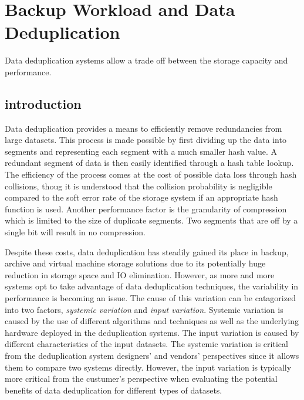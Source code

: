 \chapter{Backup Workload and Data Deduplication}
\label{dedup}
Data deduplication systems allow a trade off between the storage capacity and performance\cite{}. 
\section{introduction}
Data deduplication provides a means to efficiently remove redundancies from large datasets. This process is made possible by first dividing up the data into segments and representing each segment with a much smaller hash value. A redundant segment of data is then easily identified through a hash table lookup. The efficiency of the process comes at the cost of possible data loss through hash collisions, thoug it is understood that the collision probability is negligible compared to the soft error rate of the storage system if an appropriate hash function is used\cite{Aronovich:2009:DSB:1534530.1534539, Zhu:2008:ADB:1364813.1364831, bobbarjung2006improving, Muthitacharoen:2001:LNF:502059.502052}. Another performance factor is the granularity of compression which is limited to the size of duplicate segments. Two segments that are off by a single bit will result in no compression.  
	
Despite these costs, data deduplication has steadily gained its place in backup\cite{Meister:2009:MCD:1534530.1534541,Lillibridge:2009:SIL:1525908.1525917,Zhu:2008:ADB:1364813.1364831}, archive\cite{you2005deep} and virtual machine storage solutions\cite{smith2008izo, Jin:2009:EDV:1534530.1534540,clements2009decentralized} due to its potentially huge reduction in storage space and IO elimination. However, as more and more systems opt to take advantage of data deduplication techniques, the variability in performance is becoming an issue. The cause of this variation can be catagorized into two factors, \emph{systemic variation} and \emph{input variation}. Systemic variation is caused by the use of different algorithms and techniques as well as the underlying hardware deployed in the deduplication systems. The input variation is caused by different characteristics of the input datasets. The systemic variation is critical from the deduplication system designers' and vendors' perspectives since it allows them to compare two systems directly. However, the input variation is typically more critical from the custumer's perspective when evaluating the potential benefits of data deduplication for different types of datasets.  

